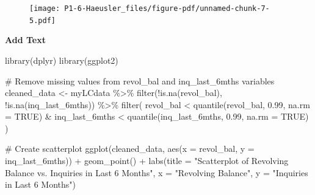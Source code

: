 \documentclass[
  letterpaper,
  DIV=11,
  numbers=noendperiod]{scrartcl}
\newenvironment{Shaded}{\begin{snugshade}}{\end{snugshade}}
\newcommand{\AttributeTok}[1]{\textcolor[rgb]{0.40,0.45,0.13}{#1}}
\newcommand{\CommentTok}[1]{\textcolor[rgb]{0.37,0.37,0.37}{#1}}
\newcommand{\ConstantTok}[1]{\textcolor[rgb]{0.56,0.35,0.01}{#1}}
\newcommand{\FloatTok}[1]{\textcolor[rgb]{0.68,0.00,0.00}{#1}}
\newcommand{\FunctionTok}[1]{\textcolor[rgb]{0.28,0.35,0.67}{#1}}
\newcommand{\NormalTok}[1]{\textcolor[rgb]{0.00,0.23,0.31}{#1}}
\newcommand{\OtherTok}[1]{\textcolor[rgb]{0.00,0.23,0.31}{#1}}
\newcommand{\SpecialCharTok}[1]{\textcolor[rgb]{0.37,0.37,0.37}{#1}}
\newcommand{\StringTok}[1]{\textcolor[rgb]{0.13,0.47,0.30}{#1}}
\begin{document}
\begin{Shaded}
\end{Shaded}

\begin{figure}[H]

{\centering \texttt{[image: P1-6-Haeusler\_files/figure-pdf/unnamed-chunk-7-5.pdf]}

}

\end{figure}

\textbf{Add Text}

\begin{Shaded}
\begin{Highlighting}[]
\FunctionTok{library}\NormalTok{(dplyr)}
\FunctionTok{library}\NormalTok{(ggplot2)}

\CommentTok{\# Remove missing values from revol\_bal and inq\_last\_6mths variables}
\NormalTok{cleaned\_data }\OtherTok{\textless{}{-}}\NormalTok{ myLCdata }\SpecialCharTok{\%\textgreater{}\%}
  \FunctionTok{filter}\NormalTok{(}\SpecialCharTok{!}\FunctionTok{is.na}\NormalTok{(revol\_bal), }\SpecialCharTok{!}\FunctionTok{is.na}\NormalTok{(inq\_last\_6mths)) }\SpecialCharTok{\%\textgreater{}\%}
  \FunctionTok{filter}\NormalTok{(}
\NormalTok{    revol\_bal }\SpecialCharTok{\textless{}} \FunctionTok{quantile}\NormalTok{(revol\_bal, }\FloatTok{0.99}\NormalTok{, }\AttributeTok{na.rm =} \ConstantTok{TRUE}\NormalTok{) }\SpecialCharTok{\&} 
\NormalTok{    inq\_last\_6mths }\SpecialCharTok{\textless{}} \FunctionTok{quantile}\NormalTok{(inq\_last\_6mths, }\FloatTok{0.99}\NormalTok{, }\AttributeTok{na.rm =} \ConstantTok{TRUE}\NormalTok{)}
\NormalTok{  )}

\CommentTok{\# Create scatterplot}
\FunctionTok{ggplot}\NormalTok{(cleaned\_data, }\FunctionTok{aes}\NormalTok{(}\AttributeTok{x =}\NormalTok{ revol\_bal, }\AttributeTok{y =}\NormalTok{ inq\_last\_6mths)) }\SpecialCharTok{+}
  \FunctionTok{geom\_point}\NormalTok{() }\SpecialCharTok{+}
  \FunctionTok{labs}\NormalTok{(}\AttributeTok{title =} \StringTok{"Scatterplot of Revolving Balance vs. Inquiries in Last 6 Months"}\NormalTok{,}
       \AttributeTok{x =} \StringTok{"Revolving Balance"}\NormalTok{,}
       \AttributeTok{y =} \StringTok{"Inquiries in Last 6 Months"}\NormalTok{)}
\end{Highlighting}
\end{Shaded}
\end{document}
